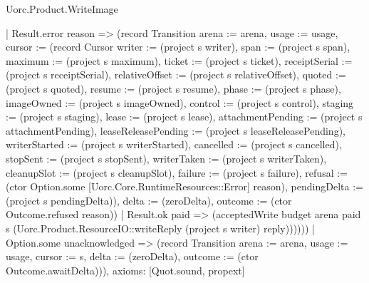 \begin{lexlean}{Uorc.Product.WriteImage}
\begin{semanticmodule}
{      | Result.error reason => (record Transition {arena := arena, usage := usage, cursor := (record Cursor {writer := (project s writer), span := (project s span), maximum := (project s maximum), ticket := (project s ticket), receiptSerial := (project s receiptSerial), relativeOffset := (project s relativeOffset), quoted := (project s quoted), resume := (project s resume), phase := (project s phase), imageOwned := (project s imageOwned), control := (project s control), staging := (project s staging), lease := (project s lease), attachmentPending := (project s attachmentPending), leaseReleasePending := (project s leaseReleasePending), writerStarted := (project s writerStarted), cancelled := (project s cancelled), stopSent := (project s stopSent), writerTaken := (project s writerTaken), cleanupSlot := (project s cleanupSlot), failure := (project s failure), refusal := (ctor Option.some [Uorc.Core.RuntimeResources::Error] reason), pendingDelta := (project s pendingDelta)}), delta := (zeroDelta), outcome := (ctor Outcome.refused reason)})
      | Result.ok paid => (acceptedWrite budget arena paid s (Uorc.Product.ResourceIO::writeReply (project s writer) reply))))))
    | Option.some unacknowledged => (record Transition {arena := arena, usage := usage, cursor := s, delta := (zeroDelta), outcome := (ctor Outcome.awaitDelta)})),
  axioms: [Quot.sound, propext]
}


\end{semanticmodule}
\end{lexlean}
